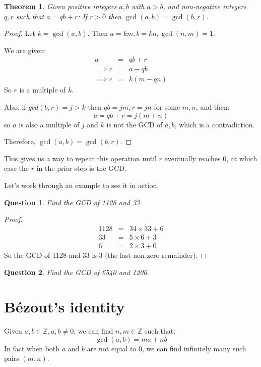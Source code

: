 \documentclass{article}
\newtheorem{theorem}{Theorem}[section]
\newtheorem{question}{Question}[section]
\begin{document}
\begin{theorem}
Given positive integers $a,b$ with $a>b$, and non-negative integers $q,r$ such that $a=qb+r$:
If $r>0$ then $\gcd(a,b) = \gcd(b,r)$.
\end{theorem}

\begin{proof}
Let $k = \gcd(a,b)$. Then $a=km, b=kn, \gcd(n,m) = 1$.

We are given:
\begin{eqnarray*}
 a &=& qb+r \\
\implies r &=& a-qb \\
\implies r &=& k(m-qn) 
\end{eqnarray*}
So $r$ is a multiple of $k$.

Also, if $gcd(b,r)=j > k$ then $qb = jm, r=jn$ for some $m,n$, and then:
\[ a = qb+r = j(m+n) \]
so $a$ is also a multiple of $j$ and $k$ is not the GCD of $a,b$, which is a contradiction.

Therefore, $\gcd(a,b) = \gcd(b,r)$. 
\end{proof}

This gives us a way to repeat this operation until $r$ eventually reaches $0$, at which case the $r$
in the prior step is the GCD.

Let's work through an example to see it in action.

\begin{question} Find the GCD of 1128 and 33. \end{question}
\begin{proof}
\begin{eqnarray*}
1128 &=& 34\times 33 + 6 \\
33 &=& 5\times 6 + 3 \\
6 &=& 2 \times 3 + 0   
\end{eqnarray*}
So the GCD of 1128 and 33 is 3 (the last non-zero remainder).
\end{proof}

\begin{question} Find the GCD of 6540 and 1206. \end{question}
\vspace*{\bigskipamount}

\section{Bézout's identity}

Given $a,b \in \mathbb{Z}, a, b \neq 0$, we can find $n,m \in \mathbb{Z}$ such that:
\[ \gcd(a,b) = ma + nb \]
In fact when both $a$ and $b$ are not equal to 0, we can find infinitely many such pairs $(m,n)$.
\end{document}
